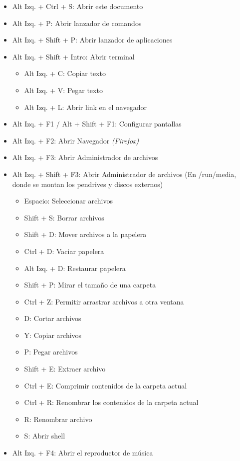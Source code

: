 \documentclass[12pt]{article}
\begin{document}
\begin{itemize}
\setlength\itemsep{-0.4em}
\item Alt Izq. + Ctrl + S: Abrir este documento
\item Alt Izq. + P: Abrir lanzador de comandos
\item Alt Izq. + Shift + P: Abrir lanzador de aplicaciones
\item Alt Izq. + Shift + Intro: Abrir terminal
\begin{itemize}
\setlength\itemsep{-0.3em}
\item Alt Izq. + C: Copiar texto
\item Alt Izq. + V: Pegar texto
\item Alt Izq. + L: Abrir link en el navegador
\end{itemize}
\item Alt Izq. + F1 / Alt + Shift + F1: Configurar pantallas
\item Alt Izq. + F2: Abrir Navegador \emph{(Firefox)}
\item Alt Izq. + F3: Abrir Administrador de archivos
\item Alt Izq. + Shift + F3: Abrir Administrador de archivos (En /run/media, donde se montan los pendrives y discos externos)
\begin{itemize}
\setlength\itemsep{-0.3em}
\item Espacio: Seleccionar archivos
\item Shift + S: Borrar archivos
\item Shift + D: Mover archivos a la papelera
\item Ctrl + D: Vaciar papelera
\item Alt Izq. + D: Restaurar papelera
\item Shift + P: Mirar el tamaño de una carpeta
\item Ctrl + Z: Permitir arrastrar archivos a otra ventana
\item D: Cortar archivos
\item Y: Copiar archivos
\item P: Pegar archivos
\item Shift + E: Extraer archivo
\item Ctrl + E: Comprimir contenidos de la carpeta actual
\item Ctrl + R: Renombrar los contenidos de la carpeta actual
\item R: Renombrar archivo
\item S: Abrir shell
\end{itemize}
\item Alt Izq. + F4: Abrir el reproductor de música

\end{itemize}
\end{document}
